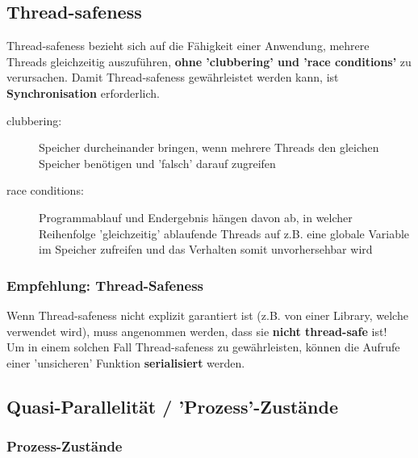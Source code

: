 \subsection{Thread-safeness}

Thread-safeness bezieht sich auf die Fähigkeit einer Anwendung, mehrere Threads gleichzeitig auszuführen,
\textbf{ohne 'clubbering' und 'race conditions'} zu verursachen. Damit Thread-safeness gewährleistet werden kann, ist \textbf{Synchronisation}
erforderlich.

\begin{description}
    \item[clubbering:] Speicher durcheinander bringen, wenn mehrere Threads den gleichen Speicher benötigen und 'falsch' darauf zugreifen
    \item[race conditions:] Programmablauf und Endergebnis hängen davon ab, in welcher Reihenfolge 'gleichzeitig' ablaufende Threads auf z.B. eine
        globale Variable im Speicher zufreifen und das Verhalten somit unvorhersehbar wird
\end{description}


\subsubsection{Empfehlung: Thread-Safeness}

Wenn Thread-safeness nicht explizit garantiert ist (z.B. von einer Library, welche verwendet wird), muss  angenommen werden, dass sie 
\textbf{nicht thread-safe} ist! \\
Um in einem solchen Fall Thread-safeness zu gewährleisten, können die Aufrufe einer 'unsicheren' Funktion \textbf{serialisiert} werden.


\subsection{Quasi-Parallelität / 'Prozess'-Zustände}

\subsubsection{Prozess-Zustände}

